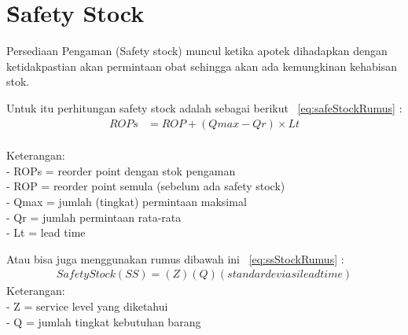 \section{\f{Safety Stock}}
Persediaan Pengaman (Safety stock) muncul ketika apotek dihadapkan dengan ketidakpastian akan permintaan obat sehingga akan ada kemungkinan kehabisan stok.

Untuk itu perhitungan safety stock adalah sebagai berikut \equ~\ref{eq:safeStockRumus} \cite{Ibrahim}:
\noindent \begin{align}\label{eq:safeStockRumus}
	ROPs &= ROP + (Qmax - Qr) \times Lt
\end{align}\\
Keterangan:\\
- ROPs = reorder point dengan stok pengaman\\
- ROP = reorder point semula (sebelum ada safety stock)\\
- Qmax = jumlah (tingkat) permintaan maksimal\\
- Qr = jumlah permintaan rata-rata\\
- Lt = lead time

Atau bisa juga menggunakan rumus dibawah ini \equ~\ref{eq:ssStockRumus} \cite{Ibrahim}:
\noindent \begin{align}\label{eq:ssStockRumus}
	Safety Stock (SS) = (Z) (Q) (standar deviasi leadtime)
\end{align}
Keterangan:\\
- Z = service level yang diketahui\\
- Q = jumlah tingkat kebutuhan barang\\